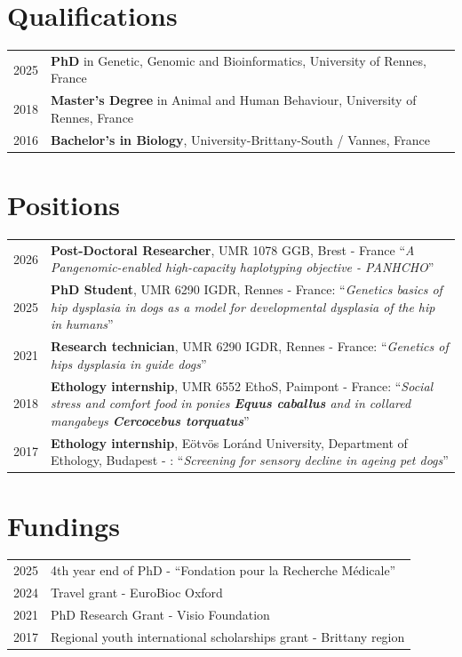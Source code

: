 \documentclass[10pt,a4paper]{moderncv}
\begin{document}
\makecvtitle

\vspace{-1cm}

\section{Qualifications}
\begin{tabularx}{\textwidth}{p{1.5cm} X}
    2025 & \textbf{PhD} in Genetic, Genomic and Bioinformatics, University of Rennes, France \\
    2018 & \textbf{Master's Degree} in Animal and Human Behaviour, University of Rennes, France \\
    2016 & \textbf{Bachelor's in Biology}, University-Brittany-South / Vannes, France \\
\end{tabularx}

\section{Positions}
\begin{tabularx}{\textwidth}{p{1.5cm} X}
    2026 & \textbf{Post-Doctoral Researcher}, UMR 1078 GGB, Brest - France
        \enquote{\textit{A Pangenomic-enabled high-capacity haplotyping objective - PANHCHO}} \\
    2025 & \textbf{PhD Student}, UMR 6290 IGDR, Rennes - France:
        \enquote{\textit{Genetics basics of hip dysplasia in dogs as a model for developmental dysplasia of the hip in humans}} \\
    2021 & \textbf{Research technician}, UMR 6290 IGDR, Rennes - France:
        \enquote{\textit{Genetics of hips dysplasia in guide dogs}} \\
    2018 & \textbf{Ethology internship}, UMR 6552 EthoS, Paimpont - France:
        \enquote{\textit{Social stress and comfort food in ponies \textbf{Equus caballus} and in collared mangabeys \textbf{Cercocebus torquatus}}} \\
    2017 & \textbf{Ethology internship}, Eötvös Loránd University, Department of Ethology, Budapest - :
        \enquote{\textit{Screening for sensory decline in ageing pet dogs}} \\    
\end{tabularx}

\section{Fundings}
\begin{tabularx}{\textwidth}{p{1.5cm} X}
    2025 & 4th year end of PhD - \enquote{Fondation pour la Recherche Médicale} \\
    2024 & Travel grant - EuroBioc Oxford \\
    2021 & PhD Research Grant - Visio Foundation \\
    2017 & Regional youth international scholarships grant - Brittany region \\
\end{tabularx}
\end{document}
